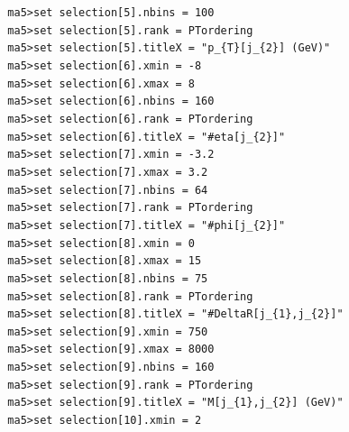 \documentclass[a4paper, 10pt]{article}
\begin{document}
\texttt{ }\texttt{ }\texttt{ma5>set selection[5].nbins = 100\\
}
\texttt{ }\texttt{ }\texttt{ma5>set selection[5].rank = PTordering\\
}
\texttt{ }\texttt{ }\texttt{ma5>set selection[5].titleX = "p\_\{T\}[j\_\{2\}] (GeV)"\\
}
\texttt{ }\texttt{ }\texttt{ma5>set selection[6].xmin = -8\\
}
\texttt{ }\texttt{ }\texttt{ma5>set selection[6].xmax = 8\\
}
\texttt{ }\texttt{ }\texttt{ma5>set selection[6].nbins = 160\\
}
\texttt{ }\texttt{ }\texttt{ma5>set selection[6].rank = PTordering\\
}
\texttt{ }\texttt{ }\texttt{ma5>set selection[6].titleX = "\#eta[j\_\{2\}]"\\
}
\texttt{ }\texttt{ }\texttt{ma5>set selection[7].xmin = -3.2\\
}
\texttt{ }\texttt{ }\texttt{ma5>set selection[7].xmax = 3.2\\
}
\texttt{ }\texttt{ }\texttt{ma5>set selection[7].nbins = 64\\
}
\texttt{ }\texttt{ }\texttt{ma5>set selection[7].rank = PTordering\\
}
\texttt{ }\texttt{ }\texttt{ma5>set selection[7].titleX = "\#phi[j\_\{2\}]"\\
}
\texttt{ }\texttt{ }\texttt{ma5>set selection[8].xmin = 0\\
}
\texttt{ }\texttt{ }\texttt{ma5>set selection[8].xmax = 15\\
}
\texttt{ }\texttt{ }\texttt{ma5>set selection[8].nbins = 75\\
}
\texttt{ }\texttt{ }\texttt{ma5>set selection[8].rank = PTordering\\
}
\texttt{ }\texttt{ }\texttt{ma5>set selection[8].titleX = "\#DeltaR[j\_\{1\},j\_\{2\}]"\\
}
\texttt{ }\texttt{ }\texttt{ma5>set selection[9].xmin = 750\\
}
\texttt{ }\texttt{ }\texttt{ma5>set selection[9].xmax = 8000\\
}
\texttt{ }\texttt{ }\texttt{ma5>set selection[9].nbins = 160\\
}
\texttt{ }\texttt{ }\texttt{ma5>set selection[9].rank = PTordering\\
}
\texttt{ }\texttt{ }\texttt{ma5>set selection[9].titleX = "M[j\_\{1\},j\_\{2\}] (GeV)"\\
}
\texttt{ }\texttt{ }\texttt{ma5>set selection[10].xmin = 2\\
}
\end{document}
